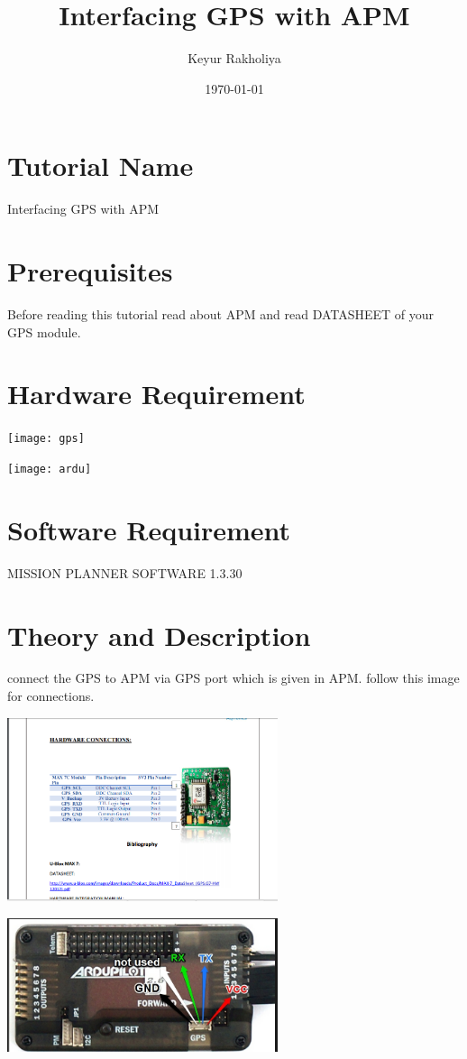 \documentclass[11pt,a4paper]{article}
\title{Interfacing GPS with APM}
\author{Keyur Rakholiya}
\date{\today}
\begin{document}
	\maketitle
	\newpage
	\tableofcontents
	\newpage
	\section{Tutorial Name}
	Interfacing GPS with APM
	\section{Prerequisites}
	Before reading this tutorial read about APM and read DATASHEET of your GPS module.
	\newpage
	\section{Hardware Requirement}
	\begin{center}
	\texttt{[image: gps]}
	
	
	\texttt{[image: ardu]}
	\end{center}
	\newpage
	\section{Software Requirement}

	MISSION PLANNER SOFTWARE 1.3.30

	\section{Theory and Description}
		connect the GPS to APM via GPS port which is given in APM.
		follow this image for connections.
		\begin{center}

		\includegraphics[width = 300px]{gps2}
		
		\includegraphics[width = 300px]{ardu2}
		\end{center}
		
\end{document}
